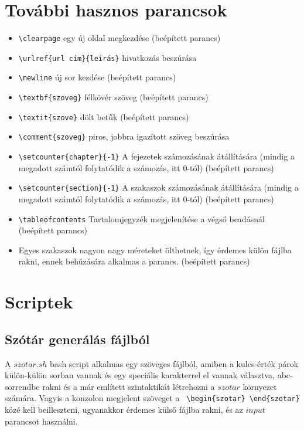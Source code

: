 \documentclass[]{article}
\begin{document}
\section{További hasznos parancsok}
\begin{itemize}
    \item \verb|\clearpage| egy új oldal megkezdése (beépített parancs)
    \item \verb|\urlref{url cím}{leírás}| hivatkozás beszúrása
    \item \verb|\newline|  új sor kezdése (beépített parancs)
    \item \verb|\textbf{szoveg}| félkövér szöveg (beépített parancs)
    \item \verb|\textit{szove}| dölt betűk (beépített parancs)
    \item \verb|\comment{szoveg}| piros, jobbra igazított szöveg beszúrása
    \item \verb|\setcounter{chapter}{-1}| A fejezetek számozásának átállítására (mindig a megadott számtól folytatódik a számozás, itt 0-tól) (beépített parancs)
    \item \verb|\setcounter{section}{-1}| A szakaszok számozásának átállítására (mindig a megadott számtól folytatódik a számozás, itt 0-tól) (beépített parancs)
    \item \verb|\tableofcontents| Tartalomjegyzék megjelenítése a végső beadásnál (beépített parancs)
    \item \verb|| Egyes szakaszok nagyon nagy méreteket ölthetnek, így érdemes külön fájlba rakni, ennek behúzására alkalmas a parancs. (beépített parancs)
\end{itemize}

\section{Scriptek}
\subsection{Szótár generálás fájlból}
A $szotar.sh$ bash script alkalmas egy szöveges fájlból, amiben a kulcs-érték párok külön-külön sorban vannak és egy speciális karakterrel el vannak választva, abc-sorrendbe rakni és a már említett szintaktikát létrehozni a $szotar$ környezet számára. Vagyis a konzolon megjelent szöveget a \verb| \begin{szotar} \end{szotar}| közé kell beilleszteni, ugyanakkor érdemes külső fájlba rakni, és az $input$ parancsot használni. 
\end{document}
